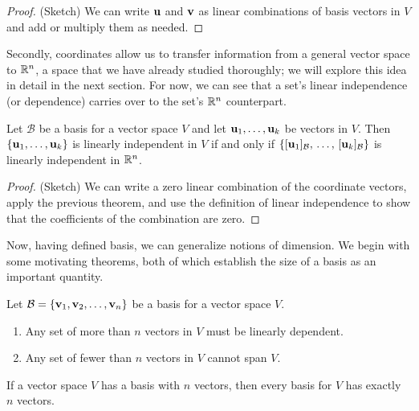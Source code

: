 \documentclass[../m073main.tex]{subfiles}
\begin{document}
\begin{proof}
	(Sketch) We can write $\mathbf{u}$ and $\mathbf{v}$ as linear combinations of basis vectors in $V$ and add or multiply them as needed.
\end{proof}

Secondly, coordinates allow us to transfer information from a general vector space to $\mathbb{R}^n$, a space that we have already studied thoroughly; we will explore this idea in detail in the next section.
For now, we can see that a set's linear independence (or dependence) carries over to the set's $\mathbb{R}^n$ counterpart.

\begin{theorem}
	Let $\mathcal{B}$ be a basis for a vector space $V$ and let $\mathbf{u}_1, \ldots, \mathbf{u}_k$ be vectors in $V$.
	Then $\{\mathbf{u}_1, \ldots, \mathbf{u}_k \}$ is linearly independent in $V$ if and only if $\{[\mathbf{u}_1]_{\mathcal{B}}, \, \ldots, \, [\mathbf{u}_k]_{\mathcal{B}}\}$ is linearly independent in $\mathbb{R}^n$.
\end{theorem}

\begin{proof}
	(Sketch) We can write a zero linear combination of the coordinate vectors, apply the previous theorem, and use the definition of linear independence to show that the coefficients of the combination are zero.
\end{proof}

Now, having defined basis, we can generalize notions of dimension.
We begin with some motivating theorems, both of which establish the size of a basis as an important quantity.

\begin{theorem}
	Let $\mathcal{B} = \{\mathbf{v}_1, \mathbf{v}_2, \ldots, \mathbf{v}_n\}$ be a basis for a vector space $V$.
	\begin{enumerate}[label=(\alph*)]
		\item Any set of more than $n$ vectors in $V$ must be linearly dependent.
		\item Any set of fewer than $n$ vectors in $V$ cannot span $V$.
	\end{enumerate}
\end{theorem}

\begin{theorem}
	If a vector space $V$ has a basis with $n$ vectors, then every basis for $V$ has exactly $n$ vectors.
\end{theorem}
\end{document}
